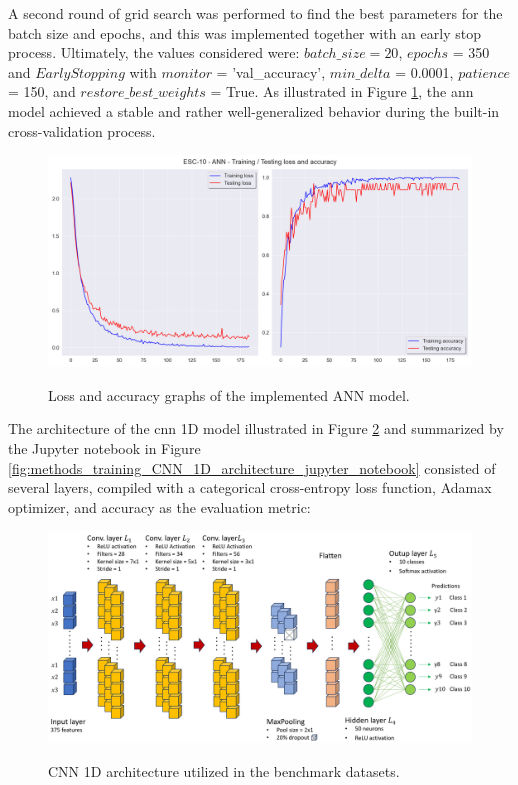 A second round of grid search was performed to find the best parameters for the batch size and epochs, and this was implemented together with an early stop process. Ultimately, the values considered were: $batch\_size = 20$, $epochs$ = 350 and $EarlyStopping$ with $monitor$ = 'val\_accuracy', $min\_delta$ = 0.0001, $patience$ = 150, and $restore\_best\_weights$ = True. As illustrated in Figure \ref{fig:methods_training_ANN_loss_and_accuracy_graphs}, the \gls{ann} model achieved a stable and rather well-generalized behavior during the built-in cross-validation process.


\begin{figure}[htbp]
    \raggedright
        \caption{Loss and accuracy graphs of the implemented ANN model.}
        \includegraphics[width=1\textwidth]{resources/images/050-methods/Methods_training_ANN_loss_accuracy.png}
        \label{fig:methods_training_ANN_loss_and_accuracy_graphs}
\end{figure} 

The architecture of the \gls{cnn} 1D model illustrated in Figure \ref{fig:methods_training_CNN_1D_architecture} and summarized by the Jupyter notebook in Figure \ref{fig:methods_training_CNN_1D_architecture_jupyter_notebook} consisted of several layers, compiled with a categorical cross-entropy loss function, Adamax optimizer, and accuracy as the evaluation metric:

\begin{figure}[htbp]
    \raggedright
        \caption{CNN 1D architecture utilized in the benchmark datasets.}
        \includegraphics[width=1\textwidth]{resources/images/050-methods/Methods_training_CNN1D_architecture.png}
        \label{fig:methods_training_CNN_1D_architecture}
\end{figure} 

